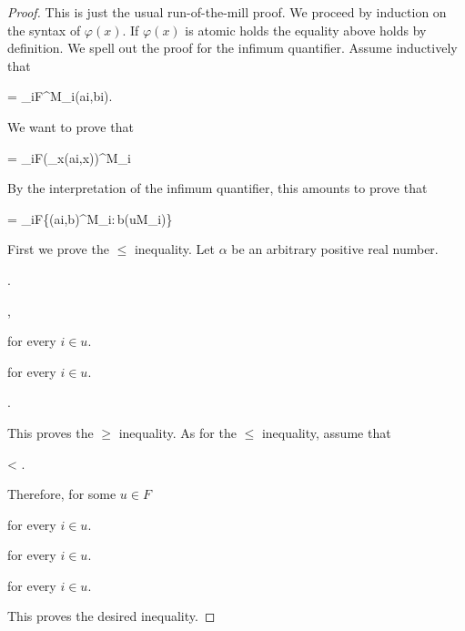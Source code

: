 \documentclass[12pt,letterpaper,oneside,reqno]{amsart}
\theoremstyle{plain}
\theoremstyle{remark}
\begin{document}
\begin{proof}
  This is just the usual run-of-the-mill proof.
  We proceed by induction on the syntax of $\varphi(x)$.
  If $\varphi(x)$ is atomic holds the equality above holds by definition.
  We spell out the proof for the infimum quantifier.
  Assume inductively that

  {=}
  {\lim_{i\uparrow F}\varphi^{M_i}\big(\hat ai,\hat bi\big).}

  We want to prove that

  {=}
  {\lim_{i\uparrow F}\Big(\bigwedge_x\varphi\big(\hat ai,x\big)\Big)^{M_i}}

  By the interpretation of the infimum quantifier, this amounts to prove that

  {=}
  {\lim_{i\uparrow F}\inf\big\{\varphi\big(\hat ai,b\big)^{M_i}:\,b\in(uM_i)\big\}}

  First we prove the $\le$ inequality.
  Let $\alpha$ be an arbitrary positive real number.

  .

  ,

  \quad for every $i\in u$.

  \quad for every $i\in u$.

  .

  \smallskip
  This proves the $\ge$ inequality.
  As for the $\le$ inequality, assume that
  \smallskip

  {<}
  {\alpha.}

  Therefore, for some $u\in F$

  \quad for every $i\in u$.

  \quad for every $i\in u$.

  \quad for every $i\in u$.



  This proves the desired inequality.
\end{proof}
\end{document}
